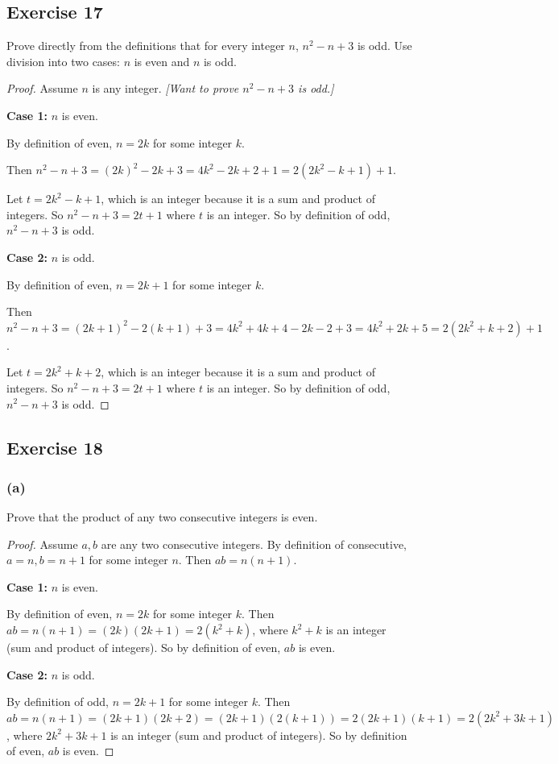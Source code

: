 \documentclass[14pt]{extarticle}
\begin{document}
\subsection{Exercise 17}
Prove directly from the definitions that for every integer $n$, $n^2-n + 3$ is odd. Use division into two cases: $n$ is even and $n$ is odd.

\begin{proof}
Assume $n$ is any integer. {\it [Want to prove $n^2-n + 3$ is odd.]}

{\bf Case 1:} $n$ is even.

By definition of even, $n = 2k$ for some integer $k$. 

Then $n^2-n + 3 = (2k)^2 - 2k + 3 = 4k^2 - 2k + 2 + 1 = 2(2k^2 - k + 1) + 1$. 

Let $t = 2k^2 - k + 1$, which is an integer because it is a sum and product of integers. So $n^2 - n + 3 = 2t+1$ where $t$ is an integer. So by definition of odd, $n^2 - n + 3$ is odd.

{\bf Case 2:} $n$ is odd.

By definition of even, $n = 2k + 1$ for some integer $k$. 

Then $n^2-n + 3 = (2k+1)^2 - 2(k+1) + 3 = 4k^2 + 4k + 4 - 2k - 2 + 3 = 4k^2 + 2k + 5 = 2(2k^2 + k + 2) + 1$. 

Let $t = 2k^2 + k + 2$, which is an integer because it is a sum and product of integers. So $n^2 - n + 3 = 2t+1$ where $t$ is an integer. So by definition of odd, $n^2 - n + 3$ is odd.
\end{proof}

\subsection{Exercise 18}

\subsubsection{(a)}
Prove that the product of any two consecutive integers is even.

\begin{proof}
Assume $a,b$ are any two consecutive integers. By definition of consecutive, $a = n, b = n+1$ for some integer $n$. Then $ab = n(n+1)$.

{\bf Case 1:} $n$ is even.

By definition of even, $n = 2k$ for some integer $k$. Then $ab = n(n+1) = (2k)(2k+1) = 2(k^2+k)$, where $k^2+k$ is an integer (sum and product of integers). So by definition of even, $ab$ is even.

{\bf Case 2:} $n$ is odd.

By definition of odd, $n = 2k+1$ for some integer $k$. Then $ab = n(n+1) = (2k+1)(2k+2) = (2k+1)(2(k+1)) = 2(2k+1)(k+1) = 2(2k^2 + 3k + 1)$, where $2k^2 + 3k + 1$ is an integer (sum and product of integers). So by definition of even, $ab$ is even.
\end{proof}
\end{document}
